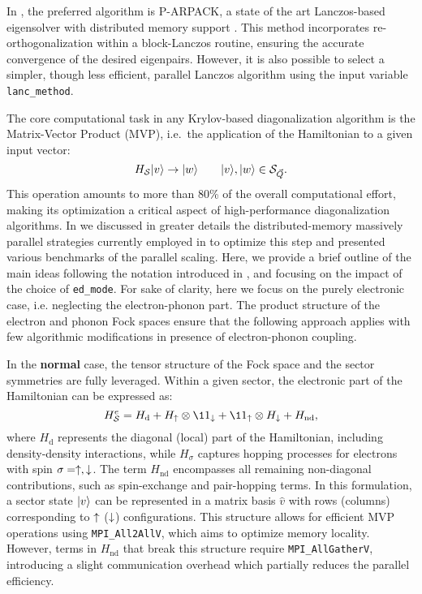 \documentclass[edipack_sp.tex]{subfiles}
\begin{document}
In \NAME, the preferred algorithm is P-ARPACK, a state of the art
Lanczos-based eigensolver with distributed memory support
\cite{Lehoucq1998}. This method incorporates re-orthogonalization within
a block-Lanczos routine, ensuring the accurate convergence of the desired eigenpairs. However, it is also possible to select a simpler,
though less efficient, parallel Lanczos algorithm using the input variable {\tt lanc\_method}.

The core computational task in any Krylov-based diagonalization
algorithm is the Matrix-Vector Product (MVP), i.e.~the application
of the Hamiltonian to a given input vector:
\begin{equation}
H_{\cal S} |v\rangle \to |w\rangle\qquad |v\rangle,|w\rangle\in {\cal S}_{\vec{Q}}.
\end{equation}
This operation amounts to more than 80\% of the overall
computational effort, making its optimization a critical aspect of
high-performance diagonalization algorithms. In  we discussed in greater details the distributed-memory massively parallel strategies currently employed in \NAME to optimize this step and presented various benchmarks of the parallel scaling. 
Here, we provide a brief outline of the main ideas following the notation introduced
in , and focusing on the impact of the choice of {\tt ed\_mode}. For sake of clarity, here we focus on the purely electronic case, i.e. neglecting the electron-phonon part. The product structure of the electron and phonon Fock spaces ensure that the following approach applies with few algorithmic modifications in presence of electron-phonon coupling.  



In the {\bf normal} case, the tensor structure of the Fock space and the sector
symmetries are fully leveraged. Within a given sector, the electronic
part of the Hamiltonian can be expressed as:
\begin{equation}
H^e_{\SS} = H_\mathrm{d} + H_\up\otimes \11_\dw + \11_\up\otimes
H_\dw + H_\mathrm{nd},
\label{HssNormal}
\end{equation}
where $H_\mathrm{d}$ represents the diagonal (local) part of the
Hamiltonian, including density-density interactions, while
$H_\sigma$ captures hopping processes for electrons with spin
$\sigma=\uparrow,\downarrow$. The term $H_\mathrm{nd}$ encompasses all remaining
non-diagonal contributions, such as spin-exchange and pair-hopping
terms.
%
In this formulation, a sector state $|v\rangle$ can be
represented in a matrix basis $\hat{v}$ with rows (columns)
corresponding to $\uparrow$ ($\downarrow$) configurations. This structure allows
for efficient MVP operations using {\tt MPI\_All2AllV}, which aims to
optimize memory locality. However, terms in $H_\mathrm{nd}$ that
break this structure require {\tt MPI\_AllGatherV}, introducing a
slight communication overhead which partially reduces the parallel efficiency.
\end{document}
